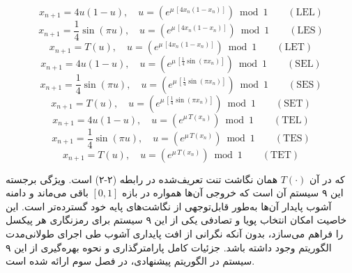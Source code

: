 \begin{equation}
x_{n+1} = 4u(1-u), \quad u = \left(e^{\mu\, [4x_n(1-x_n)]}\right) \bmod 1 \qquad (\mathrm{LEL}) \label{eq:ecm-lel}
\end{equation}
\begin{equation}
x_{n+1} = \frac{1}{4}\sin(\pi u), \quad u = \left(e^{\mu\, [4x_n(1-x_n)]}\right) \bmod 1 \qquad (\mathrm{LES}) \label{eq:ecm-les}
\end{equation}
\begin{equation}
x_{n+1} = T(u), \quad u = \left(e^{\mu\, [4x_n(1-x_n)]}\right) \bmod 1 \qquad (\mathrm{LET}) \label{eq:ecm-let}
\end{equation}
\begin{equation}
x_{n+1} = 4u(1-u), \quad u = \left(e^{\mu\, [\frac{1}{4}\sin(\pi x_n)]}\right) \bmod 1 \qquad (\mathrm{SEL}) \label{eq:ecm-sel}
\end{equation}
\begin{equation}
x_{n+1} = \frac{1}{4}\sin(\pi u), \quad u = \left(e^{\mu\, [\frac{1}{4}\sin(\pi x_n)]}\right) \bmod 1 \qquad (\mathrm{SES}) \label{eq:ecm-ses}
\end{equation}
\begin{equation}
x_{n+1} = T(u), \quad u = \left(e^{\mu\, [\frac{1}{4}\sin(\pi x_n)]}\right) \bmod 1 \qquad (\mathrm{SET}) \label{eq:ecm-set}
\end{equation}
\begin{equation}
x_{n+1} = 4u(1-u), \quad u = \left(e^{\mu\, T(x_n)}\right) \bmod 1 \qquad (\mathrm{TEL}) \label{eq:ecm-tel}
\end{equation}
\begin{equation}
x_{n+1} = \frac{1}{4}\sin(\pi u), \quad u = \left(e^{\mu\, T(x_n)}\right) \bmod 1 \qquad (\mathrm{TES}) \label{eq:ecm-tes}
\end{equation}
\begin{equation}
x_{n+1} = T(u), \quad u = \left(e^{\mu\, T(x_n)}\right) \bmod 1 \qquad (\mathrm{TET}) \label{eq:ecm-tet}
\end{equation}

که در آن $T(\cdot)$ همان نگاشت تنت تعریف‌شده در رابطه (۲-۲) است. ویژگی برجسته این ۹ سیستم آن است که خروجی آن‌ها همواره در بازه $[0,1]$ باقی می‌ماند و دامنه آشوب پایدار آن‌ها به‌طور قابل‌توجهی از نگاشت‌های پایه خود گسترده‌تر است\cite{ref4}. این خاصیت امکان انتخاب پویا و تصادفی یکی از این ۹ سیستم برای رمزنگاری هر پیکسل را فراهم می‌سازد، بدون آنکه نگرانی از افت پایداری آشوب طی اجرای طولانی‌مدت الگوریتم وجود داشته باشد. جزئیات کامل پارامترگذاری و نحوه بهره‌گیری از این ۹ سیستم در الگوریتم پیشنهادی، در فصل سوم ارائه شده است.

